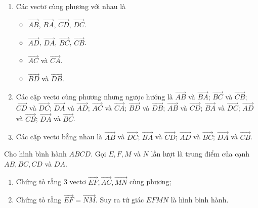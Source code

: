 \begin{tomtat}
\begin{vd}
{{			}
			{
			}
			\noindent
			\begin{enumerate}
				\item Các vectơ cùng phương với nhau là
				\begin{itemize}
					\item $\overrightarrow{AB}$, $\overrightarrow{BA}$, $\overrightarrow{CD}$, $\overrightarrow{DC}$.
					\item $\overrightarrow{AD}$, $\overrightarrow{DA}$, $\overrightarrow{BC}$, $\overrightarrow{CB}$.
					\item $\overrightarrow{AC}$ và $\overrightarrow{CA}$.
					\item $\overrightarrow{BD}$ và $\overrightarrow{DB}$.
				\end{itemize}
				\item Các cặp vectơ cùng phương nhưng ngược hướng là $\overrightarrow{AB}$ và $\overrightarrow{BA}$; $\overrightarrow{BC}$ và $\overrightarrow{CB}$; $\overrightarrow{CD}$ và $\overrightarrow{DC}$; $\overrightarrow{DA}$ và $\overrightarrow{AD}$; $\overrightarrow{AC}$ và $\overrightarrow{CA}$; $\overrightarrow{BD}$ và $\overrightarrow{DB}$; $\overrightarrow{AB}$ và $\overrightarrow{CD}$; $\overrightarrow{BA}$ và $\overrightarrow{DC}$; $\overrightarrow{AD}$ và $\overrightarrow{CB}$; $\overrightarrow{DA}$ và $\overrightarrow{BC}$.
				\item Các cặp vectơ bằng nhau là $\overrightarrow{AB}$ và $\overrightarrow{DC}$; $\overrightarrow{BA}$ và $\overrightarrow{CD}$; $\overrightarrow{AD}$ và $\overrightarrow{BC}$; $\overrightarrow{DA}$ và $\overrightarrow{CB}$.
			\end{enumerate}
		}
	\end{vd}
	\begin{vd}%
		Cho hình bình hành $ABCD$. Gọi $E, F, M$ và $N$ lần lượt là trung điểm của cạnh $AB, BC, CD$ và $DA$.
		\begin{enumerate}
			\item 	Chứng tỏ rằng 3 vectơ $\overrightarrow{EF},\overrightarrow{AC},\overrightarrow{MN}$ cùng phương;
			\item Chứng tỏ rằng $\overrightarrow{EF}=\overrightarrow{NM}$. Suy ra tứ giác $EFMN$ là hình bình hành.

\end{enumerate}
\end{vd}
\end{tomtat}
